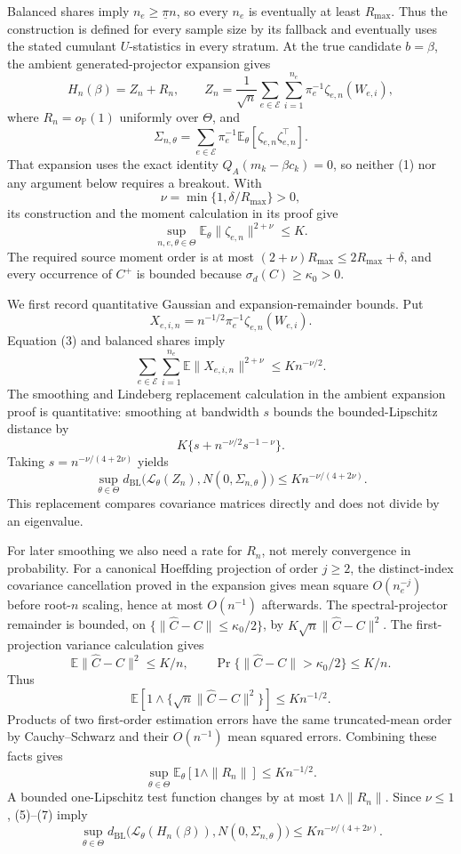 Balanced shares imply \(n_e\geq\underline\pi n\), so every \(n_e\) is eventually at least \(R_{\max}\).  Thus the construction is defined for every sample size by its fallback and eventually uses the stated cumulant \(U\)-statistics in every stratum.  At the true candidate \(b=\beta\), the ambient generated-projector expansion gives
\[
 H_n(\beta)=Z_n+R_n,
 \qquad
 Z_n=\frac1{\sqrt n}\sum_{e\in\mathcal E}\sum_{i=1}^{n_e}
 \pi_e^{-1}\zeta_{e,n}(W_{e,i}), \tag{1}
\]
where \(R_n=o_{\mathbb P}(1)\) uniformly over \(\Theta\), and
\[
 \Sigma_{n,\theta}=\sum_{e\in\mathcal E}\pi_e^{-1}
 \mathbb E_\theta[\zeta_{e,n}\zeta_{e,n}^{\top}]. \tag{2}
\]
That expansion uses the exact identity \(Q_A(m_k-\beta c_k)=0\), so neither (1) nor any argument below requires a breakout.  With
\[
 \nu=\min\{1,\delta/R_{\max}\}>0,
\]
its construction and the moment calculation in its proof give
\[
 \sup_{n,e,\theta\in\Theta}
 \mathbb E_\theta\|\zeta_{e,n}\|^{2+\nu}\leq K. \tag{3}
\]
The required source moment order is at most \((2+\nu)R_{\max}\leq2R_{\max}+\delta\), and every occurrence of \(C^+\) is bounded because \(\sigma_d(C)\geq\kappa_0>0\).

We first record quantitative Gaussian and expansion-remainder bounds.  Put
\[
 X_{e,i,n}=n^{-1/2}\pi_e^{-1}\zeta_{e,n}(W_{e,i}).
\]
Equation (3) and balanced shares imply
\[
 \sum_{e\in\mathcal E}\sum_{i=1}^{n_e}
 \mathbb E\|X_{e,i,n}\|^{2+\nu}
 \leq K n^{-\nu/2}. \tag{4}
\]
The smoothing and Lindeberg replacement calculation in the ambient expansion proof is quantitative: smoothing at bandwidth \(s\) bounds the bounded-Lipschitz distance by
\[
 K\{s+n^{-\nu/2}s^{-1-\nu}\}.
\]
Taking \(s=n^{-\nu/(4+2\nu)}\) yields
\[
 \sup_{\theta\in\Theta}
 d_{\mathrm{BL}}\bigl(\mathcal L_\theta(Z_n),N(0,\Sigma_{n,\theta})\bigr)
 \leq K n^{-\nu/(4+2\nu)}. \tag{5}
\]
This replacement compares covariance matrices directly and does not divide by an eigenvalue.

For later smoothing we also need a rate for \(R_n\), not merely convergence in probability.  For a canonical Hoeffding projection of order \(j\geq2\), the distinct-index covariance cancellation proved in the expansion gives mean square \(O(n_e^{-j})\) before root-\(n\) scaling, hence at most \(O(n^{-1})\) afterwards.  The spectral-projector remainder is bounded, on \(\{\|\widehat C-C\|\leq\kappa_0/2\}\), by \(K\sqrt n\|\widehat C-C\|^2\).  The first-projection variance calculation gives
\[
 \mathbb E\|\widehat C-C\|^2\leq K/n,
 \qquad
 \Pr\{\|\widehat C-C\|>\kappa_0/2\}\leq K/n. \tag{6}
\]
Thus
\[
 \mathbb E\!\left[1\wedge\{\sqrt n\|\widehat C-C\|^2\}\right]
 \leq K n^{-1/2}.
\]
Products of two first-order estimation errors have the same truncated-mean order by Cauchy--Schwarz and their \(O(n^{-1})\) mean squared errors.  Combining these facts gives
\[
 \sup_{\theta\in\Theta}\mathbb E_\theta[1\wedge\|R_n\|]
 \leq K n^{-1/2}. \tag{7}
\]
A bounded one-Lipschitz test function changes by at most \(1\wedge\|R_n\|\).  Since \(\nu\leq1\), (5)--(7) imply
\[
 \sup_{\theta\in\Theta}
 d_{\mathrm{BL}}\bigl(\mathcal L_\theta(H_n(\beta)),
 N(0,\Sigma_{n,\theta})\bigr)
 \leq K n^{-\nu/(4+2\nu)}. \tag{8}
\]

